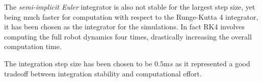 The \textit{semi-implicit Euler} integrator is also not stable for the largest step size, yet being much faster for computation with respect to the Runge-Kutta 4 integrator, it has been chosen as the integrator for the simulations. In fact RK4 involves computing the full robot dynamics four times, drastically increasing the overall computation time.

The integration step size has been chosen to be $0.5\text{m}s$ as it represented a good tradeoff between integration stability and computational effort.
